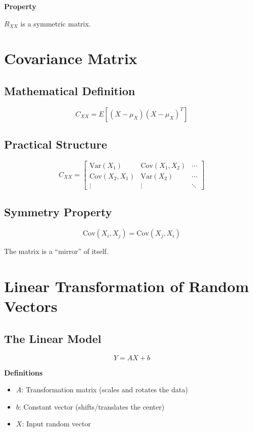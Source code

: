 \documentclass[12pt]{article}
\begin{document}
\textbf{Property}

$R_{XX}$ is a symmetric matrix.

\section{Covariance Matrix}

\subsection{Mathematical Definition}

\[
C_{XX} = E[(X - \mu_X)(X - \mu_X)^T]
\]

\subsection{Practical Structure}

\[
C_{XX} =
\begin{bmatrix}
\text{Var}(X_1) & \text{Cov}(X_1, X_2) & \cdots \\
\text{Cov}(X_2, X_1) & \text{Var}(X_2) & \cdots \\
\vdots & \vdots & \ddots
\end{bmatrix}
\]

\subsection{Symmetry Property}

\[
\text{Cov}(X_i, X_j) = \text{Cov}(X_j, X_i)
\]

The matrix is a “mirror” of itself.

\section{Linear Transformation of Random Vectors}

\subsection{The Linear Model}

\[
Y = AX + b
\]

\textbf{Definitions}
\begin{itemize}
\item $A$: Transformation matrix (scales and rotates the data)
\item $b$: Constant vector (shifts/translates the center)
\item $X$: Input random vector
\end{itemize}
\end{document}
